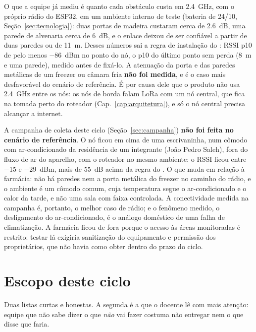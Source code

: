 O que a equipe já mediu é quanto cada obstáculo custa em
\SI{2,4}{\giga\hertz}, com o próprio rádio do ESP32, em um ambiente
interno de teste (bateria de 24/10, Seção~\ref{sec:tecnologia}): duas
portas de madeira custaram cerca de \SI{2,6}{\deci\bel}, uma parede de
alvenaria cerca de \SI{6}{\deci\bel}, e o enlace deixou de ser
confiável a partir de duas paredes ou de \SI{11}{\metre}. Desses números
sai a regra de instalação do : RSSI p10 de pelo menos
\SI{-86}{dBm} no ponto do nó, o p10 do último ponto sem perda
(\SI{8}{\metre} e uma parede), medido antes de fixá-lo. A atenuação da
porta e das paredes metálicas de um freezer ou câmara fria \textbf{não
foi medida}, e é o caso mais desfavorável do cenário de referência. É
por causa dele que o produto não usa \SI{2,4}{\giga\hertz} entre os nós:
os nós de borda falam LoRa com um nó central, que fica na tomada perto do
roteador (Cap.~\ref{cap:arquitetura}), e só o nó central precisa
alcançar a internet.

A campanha de coleta deste ciclo (Seção~\ref{sec:campanha}) \textbf{não
foi feita no cenário de referência}. O nó ficou em cima de uma
escrivaninha, num cômodo com ar-condicionado da residência de um
integrante (João Pedro Saleh), fora do fluxo de ar do aparelho, com o
roteador no mesmo ambiente: o RSSI ficou entre \SI{-15}{} e
\SI{-29}{dBm}, mais de \SI{55}{\deci\bel} acima da regra do . O
que muda em relação à farmácia: não há paredes nem a porta metálica do
freezer no caminho do rádio, e o ambiente é um cômodo comum, cuja
temperatura segue o ar-condicionado e o calor da tarde, e não uma sala
com faixa controlada. A conectividade medida na campanha é, portanto, o
melhor caso de rádio; e o fenômeno medido, o desligamento do
ar-condicionado, é o análogo doméstico de uma falha de climatização.
A farmácia ficou de fora porque o acesso às áreas monitoradas é
restrito: testar lá exigiria sanitização do equipamento e permissão dos
proprietários, que não havia como obter dentro do prazo do ciclo.

\section{Escopo deste ciclo}

\begin{orientacao}
Duas listas curtas e honestas. A segunda é a que o docente lê com mais
atenção: equipe que não sabe dizer o que \emph{não} vai fazer costuma
não entregar nem o que disse que faria.
\end{orientacao}

